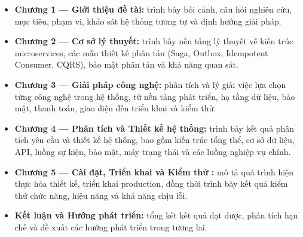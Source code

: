 \documentclass[../DoAn.tex]{subfiles}
\begin{document}
\begin{itemize}
    \item \textbf{Chương 1 --- Giới thiệu đề tài:} trình bày bối cảnh, câu hỏi nghiên cứu,
    mục tiêu, phạm vi, khảo sát hệ thống tương tự và định hướng giải pháp.

    \item \textbf{Chương 2 --- Cơ sở lý thuyết:} trình bày nền tảng lý thuyết về kiến trúc
    microservices, các mẫu thiết kế phân tán (Saga, Outbox, Idempotent Consumer, CQRS), bảo
    mật phân tán và khả năng quan sát.

    \item \textbf{Chương 3 --- Giải pháp công nghệ:} phân tích và lý giải việc lựa chọn từng
    công nghệ trong hệ thống, từ nền tảng phát triển, hạ tầng dữ liệu, bảo mật, thanh toán,
    giao diện đến triển khai và kiểm thử.

    \item \textbf{Chương 4 --- Phân tích và Thiết kế hệ thống:} trình bày kết quả phân tích
    yêu cầu và thiết kế hệ thống, bao gồm kiến trúc tổng thể, cơ sở dữ liệu, API, luồng sự
    kiện, bảo mật, máy trạng thái và các luồng nghiệp vụ chính.

    \item \textbf{Chương 5 --- Cài đặt, Triển khai và Kiểm thử :} mô tả quá trình
    hiện thực hóa thiết kế, triển khai production, đồng thời trình bày kết quả
    kiểm thử chức năng, hiệu năng và khả năng chịu lỗi.

    \item \textbf{Kết luận và Hướng phát triển:} tổng kết kết quả đạt được, phân tích hạn chế
    và đề xuất các hướng phát triển trong tương lai.
\end{itemize}

\end{document}
